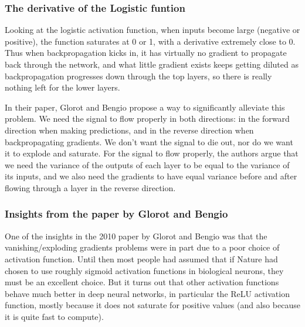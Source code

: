 \documentclass{beamer}
\begin{document}
\begin{frame}
\frametitle{The derivative of the Logistic funtion}

Looking at the logistic activation function, when inputs become large
(negative or positive), the function saturates at 0 or 1, with a
derivative extremely close to 0. Thus when backpropagation kicks in,
it has virtually no gradient to propagate back through the network,
and what little gradient exists keeps getting diluted as
backpropagation progresses down through the top layers, so there is
really nothing left for the lower layers.

In their paper, Glorot and Bengio propose a way to significantly
alleviate this problem. We need the signal to flow properly in both
directions: in the forward direction when making predictions, and in
the reverse direction when backpropagating gradients. We don’t want
the signal to die out, nor do we want it to explode and saturate. For
the signal to flow properly, the authors argue that we need the
variance of the outputs of each layer to be equal to the variance of
its inputs, and we also need the gradients to have equal variance
before and after flowing through a layer in the reverse direction.
\end{frame}

\begin{frame}
\frametitle{Insights from the paper by Glorot and Bengio}

One of the insights in the 2010 paper by Glorot and Bengio was that
the vanishing/exploding gradients problems were in part due to a poor
choice of activation function. Until then most people had assumed that
if Nature had chosen to use roughly sigmoid activation functions in
biological neurons, they must be an excellent choice. But it turns out
that other activation functions behave much better in deep neural
networks, in particular the ReLU activation function, mostly because
it does not saturate for positive values (and also because it is quite
fast to compute).
\end{frame}
\end{document}
